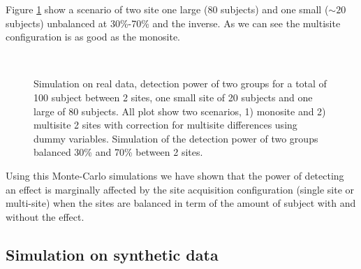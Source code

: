 \documentclass[authoryear]{elsarticle}
\begin{document}
Figure \ref{fig_real_sim_debalancing_2sites} show a scenario of two site one large (80 subjects) and one small ($\sim20$ subjects) unbalanced at 30\%-70\% and the inverse. As we can see the multisite configuration is as good as the monosite.

\begin{figure}[tbp]
\centering
\captionsetup[subfloat]{labelformat=empty}
\\
\caption{
Simulation on real data, detection power of two groups for a total of 100 subject between 2 sites, one small site of 20 subjects and one large of 80 subjects. All plot show two scenarios, 1) monosite and 2) multisite 2 sites with correction for multisite differences using dummy variables. Simulation of the detection power of two groups balanced 30\% and 70\% between 2 sites.
}
\label{fig_real_sim_debalancing_2sites}
\end{figure}

Using this Monte-Carlo simulations we have shown that the power of detecting an effect is marginally affected by the site acquisition configuration (single site or multi-site) when the sites are balanced in term of the amount of subject with and without the effect. 


\subsection{Simulation on synthetic data}
 
\end{document}
